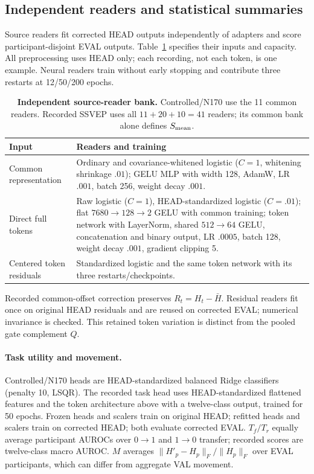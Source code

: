 \subsection{Independent readers and statistical summaries}
\label{app:independent-readouts}
\label{app:full-token-readers}
Source readers fit corrected HEAD outputs independently of adapters and
score participant-disjoint EVAL outputs. Table~\ref{tab:reader-bank} specifies
their inputs and capacity. All preprocessing uses HEAD only; each recording,
not each token, is one example. Neural readers train without early stopping
and contribute three restarts at 12/50/200 epochs.

\begin{table}[htbp]
\centering\small
\caption{\textbf{Independent source-reader bank.} Controlled/N170 use the
11 common readers. Recorded SSVEP uses all $11+20+10=41$ readers; its common
bank alone defines $S_{\rm mean}$.}
\label{tab:reader-bank}
\begin{tabular}{@{}>{\raggedright\arraybackslash}p{.23\linewidth}>{\raggedright\arraybackslash}p{.71\linewidth}@{}}
\toprule
Input & Readers and training \\
\midrule
Common representation & Ordinary and covariance-whitened logistic ($C=1$,
whitening shrinkage $.01$); GELU MLP with width 128, AdamW, LR $.001$,
batch 256, weight decay $.001$. \\
\addlinespace
Direct full tokens & Raw logistic ($C=1$), HEAD-standardized logistic
($C=.01$); flat $7680\to128\to2$ GELU with common training; token network
with LayerNorm, shared $512\to64$ GELU, concatenation and binary output,
LR $.0005$, batch 128, weight decay $.001$, gradient clipping 5. \\
\addlinespace
Centered token residuals & Standardized logistic and the same token network
with its three restarts/checkpoints. \\
\bottomrule
\end{tabular}
\end{table}

Recorded common-offset correction preserves $R_t=H_t-\bar H$.
Residual readers fit once on original HEAD residuals and are reused on
corrected EVAL; numerical invariance is checked. This retained token
variation is distinct from the pooled gate complement $Q$.

\paragraph{Task utility and movement.}
Controlled/N170 heads are HEAD-standardized balanced Ridge classifiers
(penalty 10, LSQR). The recorded task head uses HEAD-standardized flattened
features and the token architecture above with a twelve-class output,
trained for 50 epochs. Frozen heads and scalers train on original HEAD;
refitted heads and scalers train on corrected HEAD; both evaluate corrected
EVAL. $T_f/T_r$ equally average participant AUROCs over $0\to1$ and
$1\to0$ transfer; recorded scores are twelve-class macro AUROC.
$M$ averages $\|H'_p-H_p\|_F/\|H_p\|_F$ over EVAL participants, which
can differ from aggregate VAL movement.

